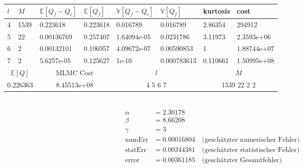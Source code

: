 \noindent\begin{tabular}{|p{0.15\q}|p{0.55\q}|p{1.4\q}|p{1.05\q}|p{1.35\q}|p{1.25\q}|p{0.9\q}|p{1.35\q}|}
	\hline
	$ l $   &  $ M $  &  $ \mathbb{E}[Q_f-Q_c] $  &   $ \mathbb{E}[Q_f] $ &  $ \mathbb{V}[Q_f-Q_c] $   &   $ \mathbb{V}[Q_f] $ &  kurtosis    &    cost\\
	\hline
	4 & 1539 &   0.223618  &  0.223618&    0.016789&    0.016789 &    2.86354&      294912  \\
	5  &  22 & 0.00136769  &  0.257407& 1.64094e-05&   0.0231786 &    3.11973&  2.3593e+06 \\
	6   &  2 & 0.00132101  &  0.106957& 4.09672e-07&  0.00590853 &          1& 1.88744e+07 \\
	7    & 2 & 5.6257e-05  &  0.125627&       1e-10& 0.000783613 &   0.110661& 1.50995e+08 \\
	\hline
	\multicolumn{2}{|c|}{$ \mathbb{E}[Q] $ }  &  \multicolumn{2}{c|}{MLMC Cost}   & \multicolumn{2}{c|}{$ l $}  &    \multicolumn{2}{c|}{$ M$} \\
	\hline
	\multicolumn{2}{|c|}{0.226363} & \multicolumn{2}{c|}{8.45513e+08  } &  \multicolumn{2}{c|}{  4 5 6 7 }     & \multicolumn{2}{c|}{1539 22 2 2}    \\
	\hline 
\end{tabular}\\
\begin{align*}
\alpha  &=     2.30178   \\
\beta   &=    8.66208   \\
\gamma  &=    3   \\
\text{numErr}  &=  0.00016804   \quad \text{(geschätzter numerischer Fehler)}\\
\text{statErr} &= 0.00344381  \quad  \text{(geschätzter statistischer Fehler)}\\
\text{error}   &= 0.00361185  \quad  \text{(geschätzter Gesamtfehler)}\\
\end{align*}


